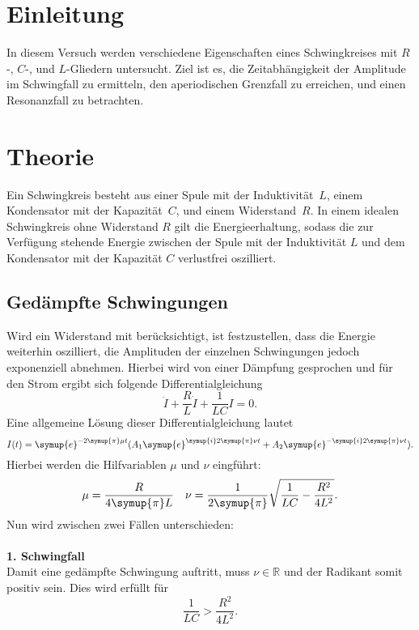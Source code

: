 \section{Einleitung}
\label{sec:Einleitung}
In diesem Versuch werden verschiedene Eigenschaften eines Schwingkreises mit $R$-, $C$-, und $L$-Gliedern untersucht. Ziel 
ist es, die Zeitabhängigkeit der Amplitude im Schwingfall zu ermitteln, den aperiodischen Grenzfall zu erreichen, und einen
Resonanzfall zu betrachten.

\section{Theorie}
\label{sec:Theorie}
Ein Schwingkreis besteht aus einer Spule mit der Induktivität~$L$, einem Kondensator mit der Kapazität~$C$, und einem 
Widerstand~$R$. In einem idealen Schwingkreis ohne Widerstand $R$ gilt die Energieerhaltung, sodass die zur Verfügung stehende 
Energie zwischen der Spule mit der Induktivität $L$ und dem Kondensator mit der Kapazität $C$ verlustfrei oszilliert.
\subsection{Gedämpfte Schwingungen}
Wird ein Widerstand mit berücksichtigt, ist festzustellen, dass die Energie weiterhin oszilliert, die Amplituden der einzelnen 
Schwingungen jedoch exponenziell abnehmen. Hierbei wird von einer Dämpfung gesprochen und für den Strom ergibt sich folgende 
Differentialgleichung
\begin{equation*}
    \ddot{I}+\frac{R}{L}\dot{I}+\frac{1}{LC}I=0.
\end{equation*}
Eine allgemeine Lösung dieser Differentialgleichung lautet
\begin{equation}
    I(t) = \symup{e}^{-2\symup{\pi}\mu t} (A_{1}\symup{e}^{\symup{i}2\symup{\pi}\nu t} + A_{2}\symup{e}^{-\symup{i}2\symup{\pi}\nu t}).
    \label{eq:DGL fuer I komplex}
\end{equation}
Hierbei werden die Hilfvariablen $\mu$ und $\nu$ eingführt:
\begin{align*}
    \mu &= \frac{R}{4\symup{\pi}L} & \nu = \frac{1}{2\symup{\pi}}\sqrt{\frac{1}{LC}-\frac{R^{2}}{4L^{2}}}.
\end{align*}
Nun wird zwischen zwei Fällen unterschieden:
\\
\\
\textbf{1. Schwingfall} \\
Damit eine gedämpfte Schwingung auftritt, muss $\nu \in \mathbb{R}$ und der Radikant somit positiv sein. Dies wird erfüllt für
\begin{equation*}
    \frac{1}{LC} > \frac{R^{2}}{4L^{2}}.
\end{equation*}

